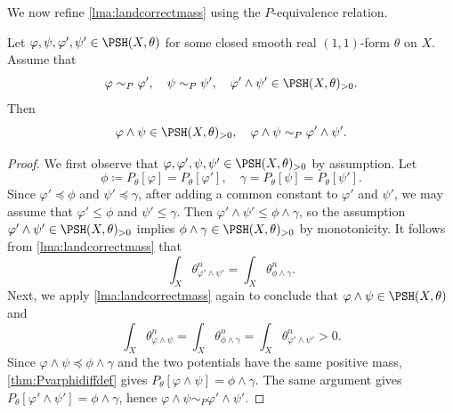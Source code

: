 We now refine \cref{lma:landcorrectmass} using the $P$-equivalence relation.
\begin{proposition}\label{prop:rooftopprePequiv}
    Let $\varphi,\psi,\varphi',\psi'\in \PSH(X,\theta)$ for some closed smooth real $(1,1)$-form $\theta$ on $X$. Assume that
    \[
    \varphi\sim_P \varphi',\quad \psi\sim_P\psi',\quad  \varphi'\land \psi'\in \PSH(X,\theta)_{>0}.
    \]
    Then
    \[
    \varphi\land \psi\in \PSH(X,\theta)_{>0},\quad \varphi\land \psi\sim_P \varphi'\land \psi'.
    \]
\end{proposition}
\begin{proof}
    We first observe that $\varphi,\varphi',\psi,\psi'\in \PSH(X,\theta)_{>0}$ by assumption. Let
    \[
    \phi\coloneqq P_{\theta}[\varphi]=P_{\theta}[\varphi'],\quad \gamma=P_{\theta}[\psi]=P_{\theta}[\psi'].
    \]
    Since $\varphi'\preceq\phi$ and $\psi'\preceq\gamma$, after adding a common constant to $\varphi'$ and $\psi'$, we may assume that $\varphi'\leq\phi$ and $\psi'\leq\gamma$. Then $\varphi'\land\psi'\leq\phi\land\gamma$, so the assumption $\varphi'\land\psi'\in \PSH(X,\theta)_{>0}$ implies $\phi\land \gamma \in \PSH(X,\theta)_{>0}$ by monotonicity. It follows from \cref{lma:landcorrectmass} that
    \[
    \int_X \theta_{\varphi'\land \psi'}^n=\int_X \theta_{\phi\land \gamma}^n.
    \]
    Next, we apply \cref{lma:landcorrectmass} again to conclude that $\varphi\land \psi\in \PSH(X,\theta)$ and
    \[
    \int_X \theta_{\varphi\land \psi}^n=\int_X \theta_{\phi\land \gamma}^n=\int_X \theta_{\varphi'\land \psi'}^n>0.
    \]
    Since $\varphi\land\psi\preceq \phi\land\gamma$ and the two potentials have the same positive mass, \cref{thm:Pvarphidiffdef} gives $P_{\theta}[\varphi\land\psi]=\phi\land\gamma$. The same argument gives $P_{\theta}[\varphi'\land\psi']=\phi\land\gamma$, hence $\varphi\land\psi\sim_P\varphi'\land\psi'$.
\end{proof}

